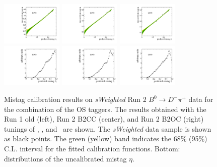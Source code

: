 \begin{figure}[hb!]
  \centering
  \includegraphics[width=0.26\textwidth]{04FlavourTagging/figs/OSelectronOpt/run1_tunings/OS_Combination_Calibration.pdf}
  \includegraphics[width=0.26\textwidth]{04FlavourTagging/figs/OSelectronOpt/run2b2cc_tunings/OS_Combination_Calibration.pdf}
  \includegraphics[width=0.26\textwidth]{04FlavourTagging/figs/OSelectronOpt/run2b2oc_tunings/OS_Combination_Calibration.pdf} \\
  \includegraphics[width=0.26\textwidth]{04FlavourTagging/figs/OSelectronOpt/run1_tunings/OS_Combination_EtaDist.pdf}
  \includegraphics[width=0.26\textwidth]{04FlavourTagging/figs/OSelectronOpt/run2b2cc_tunings/OS_Combination_EtaDist.pdf}
  \includegraphics[width=0.26\textwidth]{04FlavourTagging/figs/OSelectronOpt/run2b2oc_tunings/OS_Combination_EtaDist.pdf}
  \vspace{-2mm}
  \caption{Mistag calibration results on \emph{sWeighted} Run 2 $B^0\to D^-\pi^+$ data for the combination of the OS taggers. The results obtained with the Run 1 old (left), Run 2 B2CC (center), and Run 2 B2OC (right) tunings of \OSe, \OSmu, and \OSK~are shown. The \emph{sWeighted} data sample is shown as black points. The green (yellow) band indicates the 68\% (95\%) C.L. interval for the fitted calibration functions. Bottom: distributions of the uncalibrated mistag $\eta$.}
  \label{fig:OSePerfCalib4}
\end{figure}

